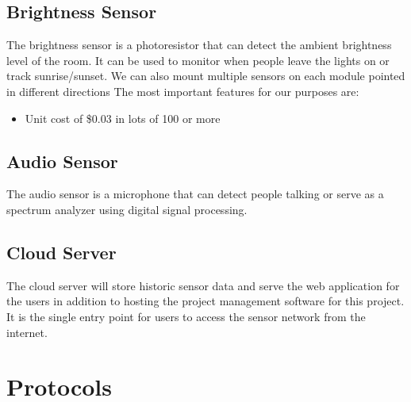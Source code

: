 		\subsection{Brightness Sensor}
			The brightness sensor is a photoresistor that can detect the ambient brightness level of the room. It can be used to monitor when people leave the lights on or track sunrise/sunset. We can also mount multiple sensors on each module pointed in different directions The most important features for our purposes are:
			\begin{itemize}
				\item Unit cost of \$0.03 in lots of 100 or more
			\end{itemize}
		
		\subsection{Audio Sensor}
			The audio sensor is a microphone that can detect people talking or serve as a spectrum analyzer using digital signal processing. %
		
		
		\subsection{Cloud Server}
			The cloud server will store historic sensor data and serve the web application for the users in addition to hosting the project management software for this project. It is the single entry point for users to access the sensor network from the internet.
	 
	\section{Protocols}

